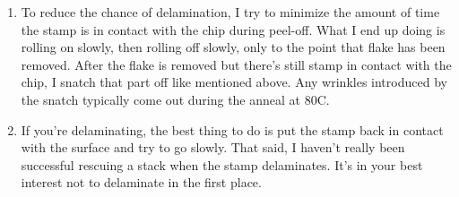 \begin{appendices}
\begin{enumerate}
	\item To reduce the chance of delamination, I try to minimize the amount of time the stamp is in contact with the chip during peel-off. What I end up doing is rolling on slowly, then rolling off slowly, only to the point that flake has been removed. After the flake is removed but there’s still stamp in contact with the chip, I snatch that part off like mentioned above. Any wrinkles introduced by the snatch typically come out during the anneal at 80C.
	\item If you’re delaminating, the best thing to do is put the stamp back in contact with the surface and try to go slowly. That said, I haven’t really been successful rescuing a stack when the stamp delaminates. It’s in your best interest not to delaminate in the first place.
\end{enumerate}


\end{appendices}
